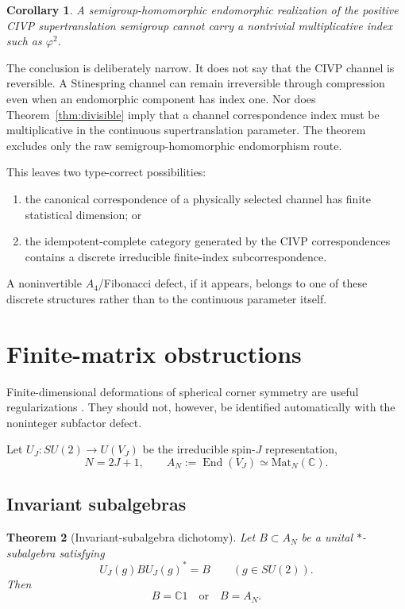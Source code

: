 \documentclass[aps,prd,preprint,nofootinbib,superscriptaddress]{revtex4-2}
\newtheorem{theorem}{Theorem}[section]
\newtheorem{corollary}[theorem]{Corollary}
\theoremstyle{definition}
\theoremstyle{remark}
\begin{document}
\begin{corollary}
A semigroup-homomorphic endomorphic realization of the positive CIVP supertranslation semigroup cannot carry a nontrivial multiplicative index such as $\varphi^2$.
\end{corollary}

The conclusion is deliberately narrow.  It does not say that the CIVP channel is reversible.  A Stinespring channel can remain irreversible through compression even when an endomorphic component has index one.  Nor does Theorem~\ref{thm:divisible} imply that a channel correspondence index must be multiplicative in the continuous supertranslation parameter.  The theorem excludes only the raw semigroup-homomorphic endomorphism route.

This leaves two type-correct possibilities:
\begin{enumerate}[leftmargin=2em]
\item the canonical correspondence of a physically selected channel has finite statistical dimension; or
\item the idempotent-complete category generated by the CIVP correspondences contains a discrete irreducible finite-index subcorrespondence.
\end{enumerate}
A noninvertible $A_4$/Fibonacci defect, if it appears, belongs to one of these discrete structures rather than to the continuous parameter itself.


\section{Finite-matrix obstructions}
\label{sec:fuzzy}

Finite-dimensional deformations of spherical corner symmetry are useful regularizations \cite{DonnellyFreidelMoosavianSperanza2023}.  They should not, however, be identified automatically with the noninteger subfactor defect.

Let $U_J:SU(2)\to U(V_J)$ be the irreducible spin-$J$ representation,
\begin{equation}
N=2J+1,
\qquad
A_N:=\operatorname{End}(V_J)\simeq\mathrm{Mat}_N(\mathbb C).
\label{eq:fuzzy}
\end{equation}

\subsection{Invariant subalgebras}

\begin{theorem}[Invariant-subalgebra dichotomy]
\label{thm:subalg}
Let $B\subset A_N$ be a unital $*$-subalgebra satisfying
\begin{equation}
U_J(g) B U_J(g)^*=B
\qquad
(g\in SU(2)).
\end{equation}
Then
\begin{equation}
B=\mathbb C1
\quad\text{or}\quad
B=A_N.
\label{eq:subalg-dichotomy}
\end{equation}
\end{theorem}
\end{document}
